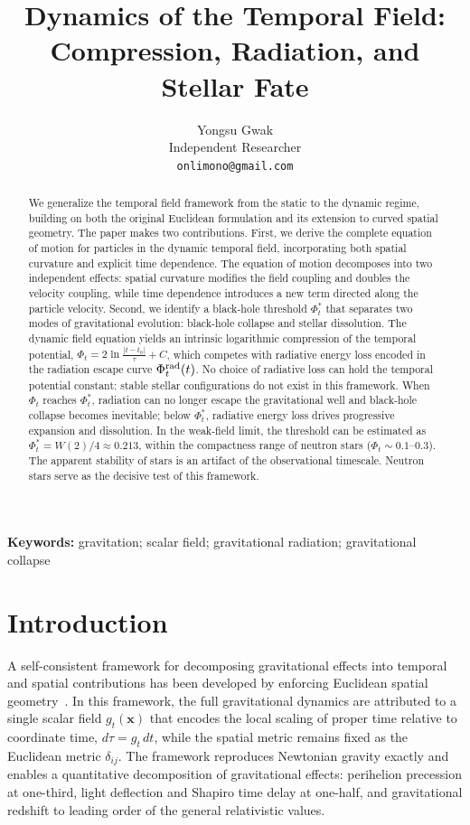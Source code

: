 \documentclass[12pt]{article}
\title{Dynamics of the Temporal Field: Compression, Radiation, and Stellar Fate}
\author{Yongsu Gwak\\[6pt]\normalsize Independent Researcher\\[2pt]\normalsize\texttt{onlimono@gmail.com}}
\date{}
\begin{document}
\maketitle

\begin{abstract}

We generalize the temporal field framework from the static to the dynamic regime, building on both the original Euclidean formulation and its extension to curved spatial geometry. The paper makes two contributions. First, we derive the complete equation of motion for particles in the dynamic temporal field, incorporating both spatial curvature and explicit time dependence. The equation of motion decomposes into two independent effects: spatial curvature modifies the field coupling and doubles the velocity coupling, while time dependence introduces a new term directed along the particle velocity. Second, we identify a black-hole threshold $\Phi_t^*$ that separates two modes of gravitational evolution: black-hole collapse and stellar dissolution. The dynamic field equation yields an intrinsic logarithmic compression of the temporal potential, $\Phi_t = 2\ln\frac{|t - t_0|}{\tau} + C$, which competes with radiative energy loss encoded in the radiation escape curve $\Phi_t^{\rm rad}(t)$. No choice of radiative loss can hold the temporal potential constant: stable stellar configurations do not exist in this framework. When $\Phi_t$ reaches $\Phi_t^*$, radiation can no longer escape the gravitational well and black-hole collapse becomes inevitable; below $\Phi_t^*$, radiative energy loss drives progressive expansion and dissolution. In the weak-field limit, the threshold can be estimated as $\Phi_t^* = W(2)/4 \approx 0.213$, within the compactness range of neutron stars ($\Phi_t \sim 0.1$--$0.3$). The apparent stability of stars is an artifact of the observational timescale. Neutron stars serve as the decisive test of this framework.

\end{abstract}

\noindent\textbf{Keywords:} gravitation; scalar field; gravitational radiation; gravitational collapse


\section{Introduction}
\label{sec:intro}

A self-consistent framework for decomposing gravitational effects into temporal and spatial contributions has been developed by enforcing Euclidean spatial geometry~\cite{Gwak2026a}. In this framework, the full gravitational dynamics are attributed to a single scalar field $g_t(\mathbf{x})$ that encodes the local scaling of proper time relative to coordinate time, $d\tau = g_t\,dt$, while the spatial metric remains fixed as the Euclidean metric $\delta_{ij}$. The framework reproduces Newtonian gravity exactly and enables a quantitative decomposition of gravitational effects: perihelion precession at one-third, light deflection and Shapiro time delay at one-half, and gravitational redshift to leading order of the general relativistic values.
\end{document}
